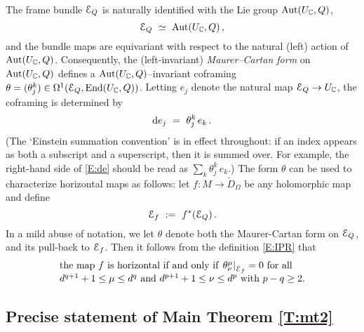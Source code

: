 \documentclass[12pt]{amsart}
\numberwithin{equation}{section}
\numberwithin{table}{section}
\numberwithin{figure}{section}
\begin{document}
The frame bundle $\mathcal E_Q$ is naturally identified with the Lie group $\mathrm{Aut}(U_\mathbb C,Q)$, 
\begin{equation}\label{E:Eisom}
  \mathcal E_Q \ \simeq \ \mathrm{Aut}(U_\mathbb C,Q) \,,
\end{equation}
and the bundle maps are equivariant with respect to the natural (left) action of $\mathrm{Aut}(U_\mathbb C,Q)$.  Consequently, the (left-invariant) \emph{Maurer--Cartan form} on $\mathrm{Aut}(U_\mathbb C,Q)$ defines a $\mathrm{Aut}(U_\mathbb C,Q)$--invariant coframing $\theta = (\theta^k_j) \in \Omega^1(\mathcal E_Q,\mathrm{End}(U_\mathbb C,Q))$.  Letting $e_j$ denote the natural map $\mathcal E_Q \to U_\mathbb C$, the coframing is determined by 
\begin{equation}\label{E:de}
  \mathrm{d} e_j \ = \ \theta_j^k \,e_k \,.
\end{equation}
(The `Einstein summation convention' is in effect throughout: if an index appears as both a subscript and a superscript, then it is summed over.  For example, the right-hand side of \eqref{E:de} should be read as $\sum_k \theta_j^k\,e_k$.)  The form $\theta$ can be used to characterize horizontal maps as follows: let $f : M \to \check D_\Omega$ be any holomorphic map and define 
\[
  \cE_f \ := \ f^*(\cE_Q)\,.
\] 
In a mild abuse of notation, we let $\theta$ denote both the Maurer-Cartan form on $\mathcal E_Q$, and its pull-back to $\mathcal E_f$.  Then it follows from the definition \eqref{E:IPR} that 
\begin{equation}\label{E:horiz1}
  \begin{array}{l}
  \hbox{the map $f$ is horizontal if and only if 
  $\left.\theta^\mu_\nu\right|_{\mathcal E_f} = 0$ for all}\\
  \hbox{$d^{q+1}+1 \le \mu \le d^q$ and $d^{p+1}+1 \le \nu \le d^p$
  with $p-q  \ge 2$.}
  \end{array}
\end{equation}

\subsection{Precise statement of Main Theorem \ref{T:mt2}}
\end{document}
